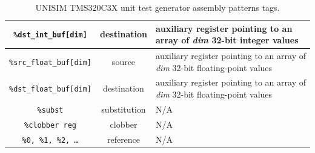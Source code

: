 \begin{table}[p]
\begin{center}
\begin{tabular}{|c|c|l|}
\hline
\texttt{\scriptsize \%dst\_int\_buf[dim]} & {\scriptsize destination} & {\scriptsize auxiliary register pointing to an array of \textit{dim} 32-bit integer values}\\
\hline
\texttt{\scriptsize \%src\_float\_buf[dim]} & {\scriptsize source} & {\scriptsize auxiliary register pointing to an array of \textit{dim} 32-bit floating-point values}\\
\hline
\texttt{\scriptsize \%dst\_float\_buf[dim]} & {\scriptsize destination} & {\scriptsize auxiliary register pointing to an array of \textit{dim} 32-bit floating-point values}\\
\hline
\texttt{\scriptsize \%subst} & {\scriptsize substitution} & {\scriptsize N/A}\\
\hline
\texttt{\scriptsize \%clobber reg} & {\scriptsize clobber} & {\scriptsize N/A}\\
\hline
\texttt{\scriptsize \%0, \%1, \%2, \ldots} & {\scriptsize reference} & {\scriptsize N/A}\\
\hline
\end{tabular}
\caption{UNISIM TMS320C3X unit test generator assembly patterns tags.}
\label{table:tms320c3x_assembly_patterns_tags}
\end{center}
\end{table}

